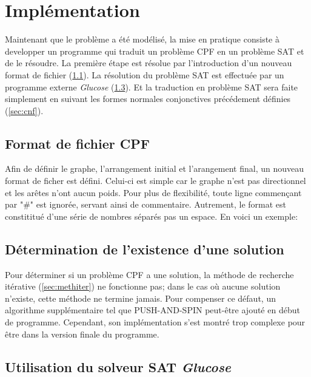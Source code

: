 \documentclass[french, 12pt, letterpaper]{article}
\theoremstyle{definition}
\theoremstyle{proposition}
\theoremstyle{example}
\begin{document}
    \newpage
    \section{Implémentation}

    Maintenant que le problème a été modélisé, la mise en pratique consiste à developper un programme qui traduit un problème CPF en 
    un problème SAT et de le résoudre.
    La première étape est résolue par l'introduction d'un nouveau format de fichier (\ref{sec:filecpf}).
    La résolution du problème SAT est effectuée par un programme externe \emph{Glucose} (\ref{sec:satsolver}). 
    Et la traduction en problème SAT sera faite simplement en suivant les formes normales conjonctives précédement définies (\ref{sec:cnf}). 

    \subsection{Format de fichier CPF}
    \label{sec:filecpf}

    Afin de définir le graphe, l'arrangement initial et l'arangement final, un nouveau format de ficher est défini.
    Celui-ci est simple car le graphe n'est pas directionnel et les arêtes n'ont aucun poids.
    Pour plus de flexibilité, toute ligne commençant par "\#" est ignorée, servant ainsi de commentaire. 
    Autrement, le format est constititué d'une série de nombres séparés pas un espace. 
    En voici un exemple:
    
    
        
    \subsection{Détermination de l'existence d'une solution}
    \label{sec:par}

    Pour déterminer si un problème CPF a une solution, la méthode de recherche itérative (\ref{sec:methiter}) ne fonctionne pas;
    dans le cas où aucune solution n'existe, cette méthode ne termine jamais.
    Pour compenser ce défaut, un algorithme supplémentaire tel que PUSH-AND-SPIN \cite{PAS} peut-être ajouté en début de programme.
    Cependant, son implémentation s'est montré trop complexe pour être dans la version finale du programme. 

    \subsection{Utilisation du solveur SAT \emph{Glucose}}
    \label{sec:satsolver}
\end{document}
